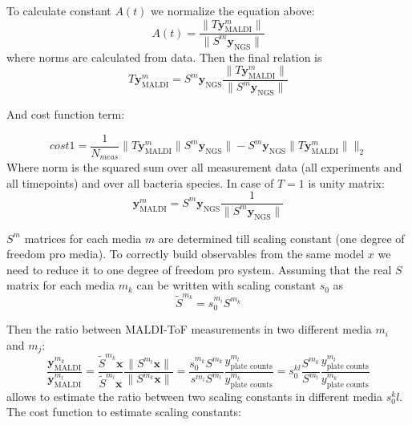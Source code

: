 \documentclass[10pt,A4paper]{article}
\begin{document}
To calculate constant $A(t)$ we normalize the equation above:
\begin{equation}
    A(t) = \frac{\lVert T \mathbf{y}^m_\text{MALDI} \rVert}{\lVert S^m \mathbf{y}_\text{NGS} \rVert}
\end{equation}
where norms are calculated from data.
Then the final relation is 
\begin{equation}
    T \mathbf{y}^m_\text{MALDI} = S^m \mathbf{y}_\text{NGS} \frac{\lVert T \mathbf{y}^m_\text{MALDI} \rVert}{\lVert S^m \mathbf{y}_\text{NGS} \rVert}
\end{equation}

And cost function term:

\begin{equation}\boxed{
    cost1 = \frac{1}{N_{meas}} \Big \lVert T \mathbf{y}^m_\text{MALDI} \lVert S^m \mathbf{y}_\text{NGS} \rVert -  S^m \mathbf{y}_\text{NGS} \lVert T \mathbf{y}^m_\text{MALDI} \rVert \Big \rVert _2}
\end{equation}
Where norm is the squared sum over all measurement data (all experiments and all timepoints) and over all bacteria species.
In case of $T = 1$ is unity matrix:
\begin{equation}
    \mathbf{y}^m_\text{MALDI} = S^m \mathbf{y}_\text{NGS} \frac{1}{\lVert S^m \mathbf{y}_\text{NGS} \rVert}
\end{equation}

$S^m$ matrices for each media $m$ are determined till scaling constant (one degree of freedom pro media).
To correctly build observables from the same model $x$ we need to reduce it to one degree of freedom pro system.
Assuming that the real $S$ matrix for each media $m_k$ can be written with scaling constant $s_0$ as
\begin{equation}
    \tilde S^{m_k} = s_0^{m_i} S^{m_k}
\end{equation}

Then the ratio between MALDI-ToF measurements in two different media $m_i$ and $m_j$:
\begin{equation}
    \frac{\mathbf{y}^{m_k}_\text{MALDI}}{\mathbf{y}^{m_l}_\text{MALDI}} = \frac{ \tilde S^{m_k} \mathbf{x}}{ \tilde S^{m_l} \mathbf{x}} \frac{\lVert S^{m_l} \mathbf{x} \rVert}{\lVert S^{m_k} \mathbf{x} \rVert} =
    \frac{s^{m_k}_0 S^{m_k} }{s^{m_l} S^{m_l}} \frac{y^{m_l}_\text{plate counts}}{y^{m_k}_\text{plate counts}} =
    s_0^{kl} \frac{S^{m_k} }{S^{m_l}} \frac{y^{m_l}_\text{plate counts}}{y^{m_k}_\text{plate counts}}
\end{equation}
allows to estimate the ratio between two scaling constants in different media $s_0^kl$.
The cost function to estimate scaling constants:
\end{document}
